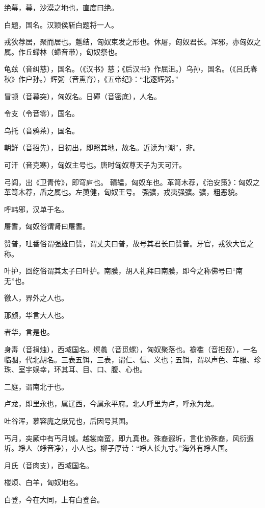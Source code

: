 \documentclass[a4paper,12pt,UTF8,twoside]{ctexbook}
\begin{document}
    绝幕，幕，沙漠之地也，直度曰绝。
    
    白题，国名。汉颖侯斩白题将一人。
    
    戎狄荐居，聚而居也。魋结，匈奴束发之形也。休屠，匈奴君长。浑邪，亦匈奴之属。作丘螮林（螮音带），匈奴祭也。
    
    龟兹（音纠慈），国名。（《汉书》慈；《后汉书》作屈沮。）乌孙，国名。（《吕氏春秋》作户孙。）辉粥（音熏育），《五帝纪》：“北逐辉粥。”
    
    冒顿（音幕突），匈奴名。日磾（音密底），人名。
    
    令支（令音零），国名。
    
    乌托（音鸦茶），国名。
    
    朝鲜（音招先），日初出，即照其地，故名。近读为“潮”，非。
    
    可汗（音克寒），匈奴主号也。唐时匈奴尊天子为天可汗。
    
    弓闾，出《卫青传》，即穹庐也。 轒辒，匈奴车也。革笥木荐，《治安策》：匈奴之革笥木荐，盾之属也。左薁健，匈奴王号。 强彍，戎夷强彍。彍，粗恶貌。
    
    呼韩邪，汉单于名。
    
    屠耆，匈奴俗谓肾曰屠耆。
    
    赞普，吐番俗谓强雄曰赞，谓丈夫曰普，故号其君长曰赞普。牙官，戎狄大官之称。
    
    叶护，回纥俗谓其太子曰叶护。南膜，胡人礼拜曰南膜，即今之称佛号曰“南无”也。
    
    徼人，界外之人也。
    
    那颜，华言大人也。
    
    者华，言是也。
    
    身毒（音捐烛），西域国名。熐蠡（音觅螺），匈奴聚落也。襜褴（音担蓝），一名临骃，代北胡名。三表五饵，三表，谓仁、信、义也；五饵，谓以声色、车服、珍珠、室宇娱幸，环其耳、目、口、腹、心也。
    
    二庭，谓南北于也。
    
    卢龙，即里永也，属辽西，今属永平府。北人呼里为卢，呼永为龙。
    
    吐谷浑，慕容廆之庶兄也，后因号其国。
    
    丐月，突厥中有丐月城。越裳南蛮，即九真也。殊裔遐圻，言化协殊裔，风衍遐圻。竫人（竫音净），小人也。柳子厚诗：“竫人长九寸。”海外有竫人国。
    
    月氏（音肉支），西域国名。
    
    楼烦、白羊，匈奴地名。
    
    白登，今在大同，上有白登台。
    
\end{document}

